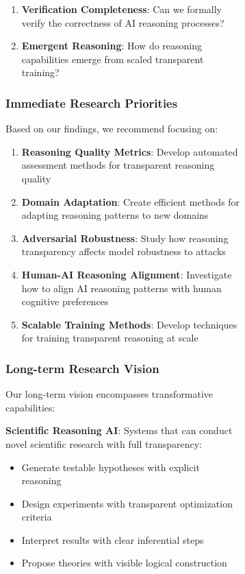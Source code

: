 \begin{figure}[H]
\begin{table}[H]
\begin{figure}[H]
\begin{table}[H]
\begin{table}[H]
\begin{enumerate}
    \item \textbf{Verification Completeness}: Can we formally verify the correctness of AI reasoning processes?
    
    \item \textbf{Emergent Reasoning}: How do reasoning capabilities emerge from scaled transparent training?
\end{enumerate}

\subsubsection{Immediate Research Priorities}

Based on our findings, we recommend focusing on:

\begin{enumerate}
    \item \textbf{Reasoning Quality Metrics}: Develop automated assessment methods for transparent reasoning quality
    \item \textbf{Domain Adaptation}: Create efficient methods for adapting reasoning patterns to new domains
    \item \textbf{Adversarial Robustness}: Study how reasoning transparency affects model robustness to attacks
    \item \textbf{Human-AI Reasoning Alignment}: Investigate how to align AI reasoning patterns with human cognitive preferences
    \item \textbf{Scalable Training Methods}: Develop techniques for training transparent reasoning at scale
\end{enumerate}

\subsubsection{Long-term Research Vision}

Our long-term vision encompasses transformative capabilities:

\textbf{Scientific Reasoning AI}: Systems that can conduct novel scientific research with full transparency:
\begin{itemize}
    \item Generate testable hypotheses with explicit reasoning
    \item Design experiments with transparent optimization criteria
    \item Interpret results with clear inferential steps
    \item Propose theories with visible logical construction
\end{itemize}


\end{table}
\end{table}
\end{figure}
\end{table}
\end{figure}
